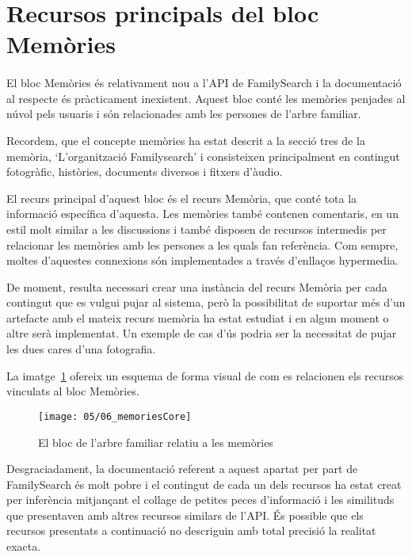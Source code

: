 \section{Recursos principals del bloc Memòries}

    \paragraph{}
    El bloc Memòries és relativament nou a l'API de FamilySearch i la documentació al respecte és pràcticament inexistent. Aquest bloc conté les memòries penjades al núvol pels usuaris i són relacionades amb les persones de l'arbre familiar.

    Recordem, que el concepte memòries ha estat descrit a la secció tres de la memòria, `L'organització Familysearch' i consisteixen principalment en contingut fotogràfic, històries, documents diversos i fitxers d'àudio.

    El recurs principal d'aquest bloc és el recurs Memòria, que conté tota la informació específica d'aquesta. Les memòries també contenen comentaris, en un estil molt similar a les discussions i també disposen de recursos intermedis per relacionar les memòries amb les persones a les quals fan referència. Com sempre, moltes d'aquestes connexions són implementades a través d'enllaços hypermedia.

    De moment, resulta necessari crear una instància del recurs Memòria per cada contingut que es vulgui pujar al sistema, però la possibilitat de suportar més d'un artefacte amb el mateix recurs memòria ha estat estudiat i en algun moment o altre serà implementat. Un exemple  de cas d'ús podria ser la necessitat de pujar les dues cares d'una fotografia.

    La imatge~\ref{img:memoriesBloc} ofereix un esquema de forma visual de com es relacionen els recursos vinculats al bloc Memòries.

    \begin{figure}[h]
        \texttt{[image: 05/06\_memoriesCore]}
        \centering
        \caption{El bloc de l'arbre familiar relatiu a les memòries}\label{img:memoriesBloc}
    \end{figure}

    Desgraciadament, la documentació referent a aquest apartat per part de FamilySearch és molt pobre i el contingut de cada un dels recursos ha estat creat per inferència mitjançant el collage de petites peces d'informació i les similituds que presentaven amb altres recursos similars de l'API. És possible que els recursos presentats a continuació no descriguin amb total precisió la realitat exacta.


